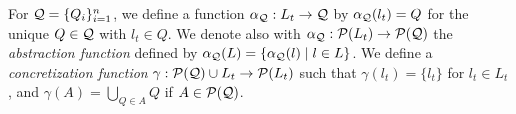 For $\mathcal{Q} = \{Q_i\}_{i=1}^n$,  we define a function $\alpha_{\mathcal{Q}} : L_t \to \mathcal{Q}$ by $\alpha_{\mathcal{Q}}(l_t) = Q$ for the unique $Q \in \mathcal{Q}$ with $l_t \in Q$. We denote also with $\alpha_{\mathcal{Q}} : \mathcal{P}(L_t) \to \mathcal{P}(\mathcal{Q})$ the \emph{abstraction function} defined by $\alpha_{\mathcal{Q}}(L) = \{\alpha_{\mathcal{Q}}(l) \mid l \in L\}$.
We define a \emph{concretization function} $\gamma :  \mathcal{P}(\mathcal{Q}) \cup L_t \to \mathcal{P}(L_t)$ such that 
$\gamma(l_t) = \{l_t\}$ for $l_t \in L_t$, and  $\gamma(A) = \bigcup_{Q \in A} Q$ if $A \in \mathcal{P}(\mathcal{Q})$.

